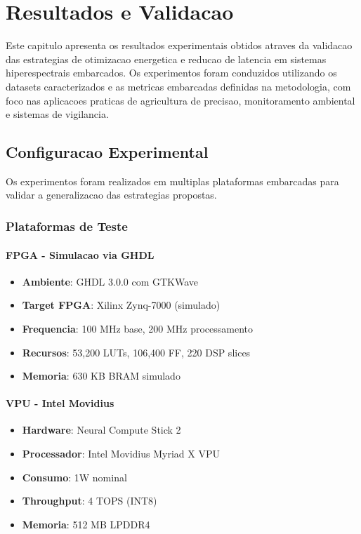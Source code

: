 \chapter{Resultados e Validacao}\label{chp:resultados}

Este capitulo apresenta os resultados experimentais obtidos atraves da validacao das estrategias de otimizacao energetica e reducao de latencia em sistemas hiperespectrais embarcados. Os experimentos foram conduzidos utilizando os datasets caracterizados e as metricas embarcadas definidas na metodologia, com foco nas aplicacoes praticas de agricultura de precisao, monitoramento ambiental e sistemas de vigilancia.

\section{Configuracao Experimental}\label{sec:configuracao_experimental}

Os experimentos foram realizados em multiplas plataformas embarcadas para validar a generalizacao das estrategias propostas.

\subsection{Plataformas de Teste}

\subsubsection{FPGA - Simulacao via GHDL}
\begin{itemize}
    \item \textbf{Ambiente}: GHDL 3.0.0 com GTKWave
    \item \textbf{Target FPGA}: Xilinx Zynq-7000 (simulado)
    \item \textbf{Frequencia}: 100 MHz base, 200 MHz processamento
    \item \textbf{Recursos}: 53,200 LUTs, 106,400 FF, 220 DSP slices
    \item \textbf{Memoria}: 630 KB BRAM simulado
\end{itemize}

\subsubsection{VPU - Intel Movidius}
\begin{itemize}
    \item \textbf{Hardware}: Neural Compute Stick 2
    \item \textbf{Processador}: Intel Movidius Myriad X VPU
    \item \textbf{Consumo}: 1W nominal
    \item \textbf{Throughput}: 4 TOPS (INT8)
    \item \textbf{Memoria}: 512 MB LPDDR4
\end{itemize}

